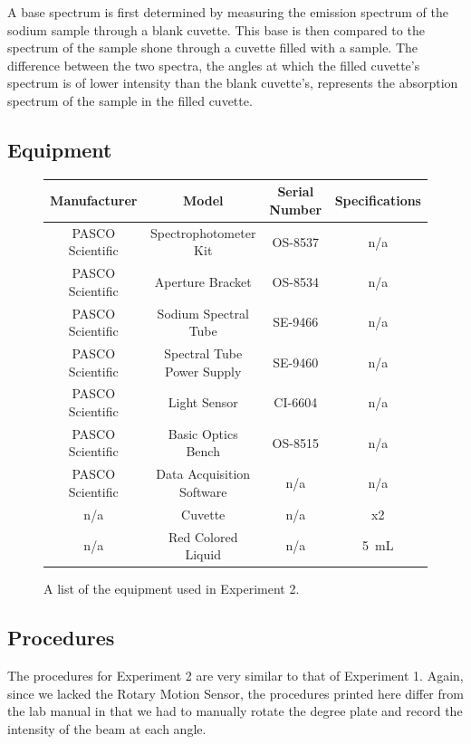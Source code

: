 \documentclass{article}
\begin{document}
\qq A base spectrum is first determined by measuring the emission spectrum of
the sodium sample through a blank cuvette. This base is then compared to the
spectrum of the sample shone through a cuvette filled with a sample. The
difference between the two spectra, the angles at which the filled cuvette's
spectrum is of lower intensity than the blank cuvette's, represents the
absorption spectrum of the sample in the filled cuvette.

\subsection{Equipment}

\begin{figure}[H]
  \label{tab:equipmentExp2}
  \caption{A list of the equipment used in Experiment 2.}
  \begin{center}
    \begin{tabular}{|c|c|c|c|}
      \hline
      Manufacturer & Model & Serial Number & Specifications \\
      \hline
      PASCO Scientific & Spectrophotometer Kit & OS-8537 & n/a \\
      PASCO Scientific & Aperture Bracket & OS-8534 & n/a \\
      PASCO Scientific & Sodium Spectral Tube & SE-9466 & n/a \\
      PASCO Scientific & Spectral Tube Power Supply & SE-9460 & n/a \\
      PASCO Scientific & Light Sensor & CI-6604 & n/a \\
      PASCO Scientific & Basic Optics Bench & OS-8515 & n/a \\
      PASCO Scientific & Data Acquisition Software & n/a & n/a \\
      n/a              & Cuvette & n/a & x2 \\
      n/a              & Red Colored Liquid & n/a & \SI{5}{\milli\liter} \\
      \hline
    \end{tabular}
  \end{center}
\end{figure}

\subsection{Procedures}

\qq The procedures for Experiment 2 are very similar to that of Experiment
1. Again, since we lacked the Rotary Motion Sensor, the procedures printed here
differ from the lab manual in that we had to manually rotate the degree plate
and record the intensity of the beam at each angle.
\end{document}
